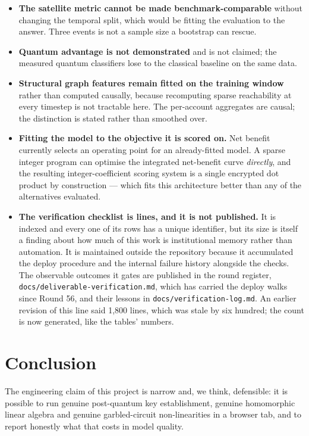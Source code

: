\documentclass[11pt,a4paper]{article}
\begin{document}
\begin{itemize}
  \item \textbf{The satellite metric cannot be made benchmark-comparable} without changing the
        temporal split, which would be fitting the evaluation to the answer. Three events is not a
        sample size a bootstrap can rescue.
  \item \textbf{Quantum advantage is not demonstrated} and is not claimed; the measured quantum
        classifiers lose to the classical baseline on the same data.
  \item \textbf{Structural graph features remain fitted on the training window} rather than computed
        causally, because recomputing sparse reachability at every timestep is not tractable here.
        The per-account aggregates are causal; the distinction is stated rather than smoothed over.
  \item \textbf{Fitting the model to the objective it is scored on.} Net benefit currently selects an
        operating point for an already-fitted model. A sparse integer program can optimise the
        integrated net-benefit curve \emph{directly}, and the resulting integer-coefficient scoring
        system is a single encrypted dot product by construction --- which fits this architecture
        better than any of the alternatives evaluated.
  \item \textbf{The verification checklist is \nchecklistlines{} lines, and it is not published.} It
        is indexed and every one of its \nchecklistrows{} rows has a unique identifier, but its size
        is itself a finding about how much of this work is institutional memory rather than
        automation. It is maintained outside the repository because it accumulated the deploy
        procedure and the internal failure history alongside the checks. The observable outcomes it
        gates are published in the round register, \texttt{docs/deliverable-verification.md}, which
        has carried the deploy walks since Round 56, and their lessons in
        \texttt{docs/verification-log.md}. An earlier revision of this line said 1{,}800 lines,
        which was stale by six hundred; the count is now generated, like the tables' numbers.
\end{itemize}

\section{Conclusion}

The engineering claim of this project is narrow and, we think, defensible: it is possible to run
genuine post-quantum key establishment, genuine homomorphic linear algebra and genuine garbled-circuit
non-linearities in a browser tab, and to report honestly what that costs in model quality.
\end{document}
